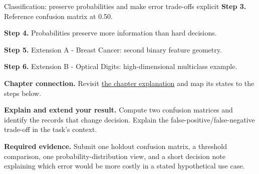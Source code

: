 \begin{labproject}{Classification: preserve probabilities and make error trade-offs explicit}
\noindent\textbf{Step 3.} Reference confusion matrix at 0.50.


\noindent\textbf{Step 4.} Probabilities preserve more information than hard decisions.


\noindent\textbf{Step 5.} Extension A - Breast Cancer: second binary feature geometry.


\noindent\textbf{Step 6.} Extension B - Optical Digits: high-dimensional multiclass example.

\textbf{Chapter connection.} Revisit \hyperref[ch:classification]{the chapter explanation} and map its states to the steps below.


\begin{verification}
\textbf{Explain and extend your result.} Compute two confusion matrices and identify the records that change decision. Explain the false-positive/false-negative trade-off in the task's context.


\textbf{Required evidence.} Submit one holdout confusion matrix, a threshold comparison, one probability-distribution view, and a short decision note explaining which error would be more costly in a stated hypothetical use case.
\end{verification}
\end{labproject}
